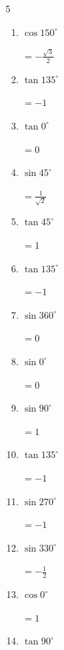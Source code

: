 \begin{multicols}{5}
\begin{enumerate}
  \item $\displaystyle \cos{150^\circ}$

        $\displaystyle =-\frac{\sqrt{3}}{2}$

\columnbreak %

  \item $\displaystyle \tan{135^\circ}$

        $\displaystyle =-1$

  \item $\displaystyle \tan{0^\circ}$

        $\displaystyle =0$

  \item $\displaystyle \sin{45^\circ}$

        $\displaystyle =\frac{1}{\sqrt{2}}$

  \item $\displaystyle \tan{45^\circ}$

        $\displaystyle =1$

  \item $\displaystyle \tan{135^\circ}$

        $\displaystyle =-1$

  \item $\displaystyle \sin{360^\circ}$

        $\displaystyle =0$

  \item $\displaystyle \sin{0^\circ}$

        $\displaystyle =0$

  \item $\displaystyle \sin{90^\circ}$

        $\displaystyle =1$

  \item $\displaystyle \tan{135^\circ}$

        $\displaystyle =-1$

  \item $\displaystyle \sin{270^\circ}$

        $\displaystyle =-1$

  \item $\displaystyle \sin{330^\circ}$

        $\displaystyle =-\frac{1}{2}$

  \item $\displaystyle \cos{0^\circ}$

        $\displaystyle =1$

  \item $\displaystyle \tan{90^\circ}$


\end{enumerate}
\end{multicols}
